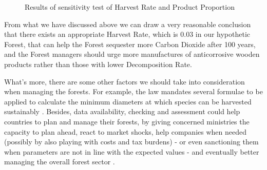 \documentclass{mcmthesis}
\numberwithin{figure}{section}
\numberwithin{table}{section}
\numberwithin{equation}{section}
\begin{document}
\begin{figure}[htbp]
  \centering

\caption{Results of sensitivity test of Harvest Rate and Product Proportion}
\end{figure}

From what we have discussed above we can draw a very reasonable conclusion that 
there exists an appropriate Harvest Rate, which is 0.03 in our hypothetic Forest, 
that can help the Forest sequester more Carbon Dioxide after 100 years, and
the Forest managers should urge more manufactures of anticorrosive wooden products
rather than those with lower Decomposition Rate. 
\par
What's more, there are some other factors we should take into consideration when 
managing the forests. For example, the law mandates several formulae to be applied 
to calculate the minimum diameters at which species can be harvested 
sustainably \citep{lumet1993etude}. Besides, data availability, checking and 
assessment could help countries to plan and manage their forests, by giving 
concerned ministries the capacity to plan ahead, react to market shocks, help
companies when needed (possibly by also playing with costs and
tax burdens) - or even sanctioning them when parameters are not
in line with the expected values - and eventually better managing
the overall forest sector \citep{2017Cerutti}.
\end{document}
